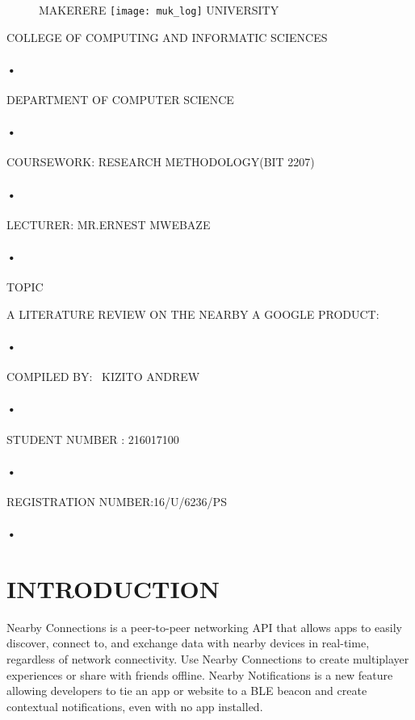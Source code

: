 \documentclass[9pt,a4paper]{article}
\begin{document}
\begin{titlepage}
  \begin{figure}[h]
  \centerline{\small MAKERERE 
  \texttt{[image: muk\_log]} UNIVERSITY}
\end{figure}
\centerline{COLLEGE OF COMPUTING AND INFORMATIC SCIENCES}
\paragraph{•}
\centerline{DEPARTMENT OF COMPUTER SCIENCE\\}
\paragraph{•}

\centerline{COURSEWORK: RESEARCH METHODOLOGY(BIT 2207)\\}
\paragraph{•}

\centerline{LECTURER: MR.ERNEST MWEBAZE}
\paragraph{•}

\centerline{TOPIC\\}A LITERATURE REVIEW ON THE  NEARBY  A GOOGLE PRODUCT:\\
\paragraph{•}
\centerline{COMPILED BY: \
 KIZITO ANDREW}
 \paragraph{•}
\centerline{STUDENT NUMBER :  216017100}
\paragraph{•}
\centerline{REGISTRATION NUMBER:16/U/6236/PS}
\paragraph{•}
\end{titlepage}
\newpage
{}
\section{INTRODUCTION}
Nearby Connections is a peer-to-peer networking API that allows apps to easily discover, connect to, and exchange data with nearby devices in real-time, regardless of network connectivity. Use Nearby Connections to create multiplayer experiences or share with friends offline.
Nearby Notifications is a new feature allowing developers to tie an app or website to a BLE beacon and create contextual notifications, even with no app installed.
\end{document}
